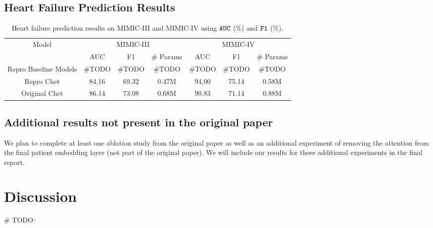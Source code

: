 \documentclass[11pt,a4paper,fleqn]{article}
\begin{document}
\subsection{Heart Failure Prediction Results}
\begin{table}[H]
\centering
\begin{tabular}{|c|c|c|c|c|c|c|}
\hline
{Model} & \multicolumn{3}{c|}{MIMIC-III} & \multicolumn{3}{c|}{MIMIC-IV} \\ \cline{2-7} 
 & AUC & F1 & \# Params & AUC & F1 & \# Params \\ \hline
{Repro Baseline Models} & \#TODO & \#TODO & \#TODO & \#TODO & \#TODO & \#TODO \\ \cline{1-7}
{Repro Chet} & 84.16 & 69.32 & 0.47M & 94.00 & 75.14 & 0.58M \\ \cline{1-7}
{Original Chet} & 86.14 & 73.08 & 0.68M & 90.83 & 71.14 & 0.88M \\ \cline{1-7}
\end{tabular}
\caption{Heart failure prediction results on MIMIC-III and MIMIC-IV using $\verb|AUC|$ (\%) and $\verb|F1|$ (\%).}
\label{tab:hf}
\end{table}

\subsection{Additional results not present in the original paper}
We plan to complete at least one ablation study from the original paper as well
as an additional experiment of removing the attention from the final patient
embedding layer (not part of the original paper). We will include our results
for these additional experiments in the final report.

\section{Discussion}
\# TODO:

\end{document}
